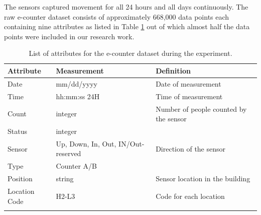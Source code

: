 \documentclass[../UNBThesis2.tex]{subfiles}
\begin{document}
\begin{itemize}
\begin{table}[ht]
\begin{tabular}{c c c}
    \end{tabular}
    
\end{table}



The sensors captured movement for all 24 hours and all days continuously. The raw e-counter dataset consists of approximately 668,000 data points each containing nine attributes as listed in Table \ref{attr} out of which almost half the data points were included in our research work. 


\begin{table}[!h]{}
\centering
\caption{List of attributes for the e-counter dataset during the experiment.}

    \begin{tabular}{p{2cm} p{3.5cm}  p{4.5cm} }
    \hline
    \textbf{Attribute} & \textbf{Measurement} & \textbf{Definition}\\ \hline
    \midrule
Date             &  mm/dd/yyyy      &   Date of measurement                                 \\\hline
Time             &  hh:mm:ss 24H    &   Time of measurement                                 \\\hline
Count            &  integer         &   Number of people counted by the sensor              \\ \hline
Status           &  integer         &                                                        \\ \hline  
Sensor           &  Up, Down, In, Out, IN/Out-reserved & Direction of the sensor             \\ \hline
Type             &  Counter A/B                                                             \\ \hline
Position         &    string         &   Sensor location in the building                                                                                                      \\ \hline
Location Code    &     H2-L3             & Code for each location                                                                                                                                       \\ \hline
    \bottomrule
    \label{attr}
\end{tabular}
\end{table}








\end{itemize}
\end{document}
